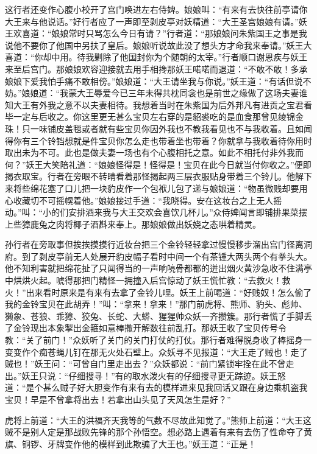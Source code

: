 \documentclass[12pt,UTF8]{ctexbook}
\begin{document}
这行者还变作心腹小校开了宫门唤进左右侍婢。娘娘叫：“有来有去快往前亭请你大王来与他说话。”好行者应了一声即至剥皮亭对妖精道：“大王圣宫娘娘有请。”妖王欢喜道：“娘娘常时只骂怎么今日有请？”行者道：“那娘娘问朱紫国王之事是我说他不要你了他国中另扶了皇后。娘娘听说故此没了想头方才命我来奉请。”妖王大喜道：“你却中用。待我剿除了他国封你为个随朝的太宰。”行者顺口谢恩疾与妖王来至后宫门。那娘娘欢容迎接就去用手相搀那妖王喏喏而退道：“不敢不敢！多承娘娘下爱我怕手痛不敢相傍。”娘娘道：“大王请坐我与你说。”妖王道：“有话但说不妨。”娘娘道：“我蒙大王辱爱今已三年未得共枕同衾也是前世之缘做了这场夫妻谁知大王有外我之意不以夫妻相待。我想着当时在朱紫国为后外邦凡有进贡之宝君看毕一定与后收之。你这里更无甚么宝贝左右穿的是貂裘吃的是血食那曾见绫锦金珠！只一味铺皮盖毯或者就有些宝贝你因外我也不教我看见也不与我收着。且如闻得你有三个铃铛想就是件宝贝你怎么走也带着坐也带着？你就拿与我收着待你用时取出未为不可。此也是做夫妻一场也有个心腹相托之意。如此不相托付非外我而何？”妖王大笑陪礼道：“娘娘怪得是！怪得是！宝贝在此今日就当付你收之。”便即揭衣取宝。行者在旁眼不转睛看着那怪揭起两三层衣服贴身带着三个铃儿。他解下来将些绵花塞了口儿把一块豹皮作一个包袱儿包了递与娘娘道：“物虽微贱却要用心收藏切不可摇幌着他。”娘娘接过手道：“我晓得。安在这妆台之上无人摇动。”叫：“小的们安排酒来我与大王交欢会喜饮几杯儿。”众侍婢闻言即铺排果菜摆上些獐鹿兔之肉将椰子酒斟来奉上。那娘娘做出妖娆之态哄着精灵。

孙行者在旁取事但挨挨摸摸行近妆台把三个金铃轻轻拿过慢慢移步溜出宫门径离洞府。到了剥皮亭前无人处展开豹皮幅子看时中间一个有茶锺大两头两个有拳头大。他不知利害就把绵花扯了只闻得当的一声响喨骨都都的迸出烟火黄沙急收不住满亭中烘烘火起。唬得那把门精怪一拥撞入后宫惊动了妖王慌忙教：“去救火！救火！”出来看时原来是有来有去拿了金铃儿哩。妖王上前喝道：“好贱奴！怎么偷了我的金铃宝贝在此胡弄！”叫：“拿来！拿来！”那门前虎将、熊师、豹头、彪帅、獭象、苍狼、乖獐、狡兔、长蛇、大蟒、猩猩帅众妖一齐攒簇。那行者慌了手脚丢了金铃现出本象掣出金箍如意棒撒开解数往前乱打。那妖王收了宝贝传号令教：“关了前门！”众妖听了关门的关门打仗的打仗。那行者难得脱身收了棒摇身一变变作个痴苍蝇儿钉在那无火处石壁上。众妖寻不见报道：“大王走了贼也！走了贼也！”妖王问：“可曾自门里走出去？”众妖都说：“前门紧锁牢拴在此不曾走出。”妖王只说：“仔细搜寻！”有的取水泼火有的仔细搜寻更无踪迹。妖王怒道：“是个甚么贼子好大胆变作有来有去的模样进来见我回话又跟在身边乘机盗我宝贝！早是不曾拿将出去！若拿出山头见了天风怎生是好？”

虎将上前道：“大王的洪福齐天我等的气数不尽故此知觉了。”熊师上前道：“大王这贼不是别人定是那战败先锋的那个孙悟空。想必路上遇着有来有去伤了性命夺了黄旗、铜锣、牙牌变作他的模样到此欺骗了大王也。”妖王道：“正是！
\end{document}

